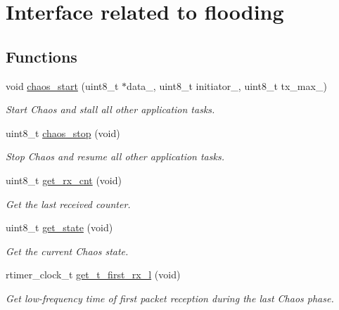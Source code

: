 \hypertarget{group__chaos__main}{\section{Interface related to flooding}
\label{group__chaos__main}
}
\subsection*{Functions}
\begin{DoxyCompactItemize}
\item 
void \hyperlink{group__chaos__main_ga2d039f5b73355d8b2bb6fd0462fe7702}{chaos\-\_\-start} (uint8\-\_\-t $\ast$data\-\_\-, uint8\-\_\-t initiator\-\_\-, uint8\-\_\-t tx\-\_\-max\-\_\-)
\begin{DoxyCompactList}\small\item\em Start Chaos and stall all other application tasks. \end{DoxyCompactList}\item 
uint8\-\_\-t \hyperlink{group__chaos__main_ga4359f0462206ab49f417cb8f89eb4d1f}{chaos\-\_\-stop} (void)
\begin{DoxyCompactList}\small\item\em Stop Chaos and resume all other application tasks. \end{DoxyCompactList}\item 
uint8\-\_\-t \hyperlink{group__chaos__main_gab2e2126a4762a97c6396ce51221eaea7}{get\-\_\-rx\-\_\-cnt} (void)
\begin{DoxyCompactList}\small\item\em Get the last received counter. \end{DoxyCompactList}\item 
uint8\-\_\-t \hyperlink{group__chaos__main_ga16ddcf3313115b5697723299590ca8f5}{get\-\_\-state} (void)
\begin{DoxyCompactList}\small\item\em Get the current Chaos state. \end{DoxyCompactList}\item 
rtimer\-\_\-clock\-\_\-t \hyperlink{group__chaos__main_ga88daf788efaacdc2705c58a822d97129}{get\-\_\-t\-\_\-first\-\_\-rx\-\_\-l} (void)
\begin{DoxyCompactList}\small\item\em Get low-\/frequency time of first packet reception during the last Chaos phase. \end{DoxyCompactList}\end{DoxyCompactItemize}


